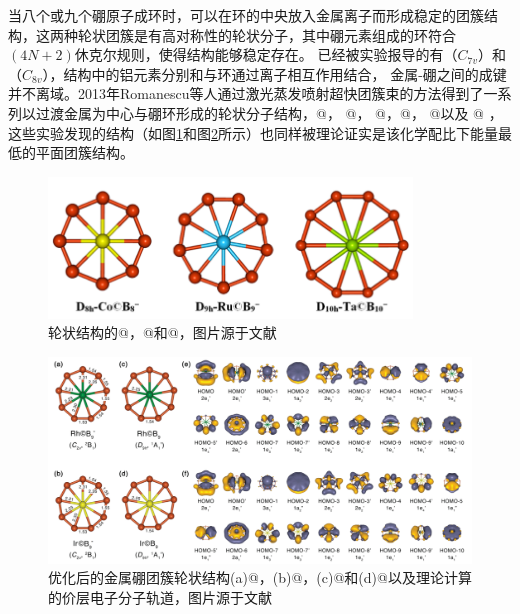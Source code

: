 当八个或九个硼原子成环时，可以在环的中央放入金属离子而形成稳定的团簇结构，这两种轮状团簇是有高对称性的轮状分子，其中硼元素组成的环符合$(4N+2)$休克尔规则，使得结构能够稳定存在\cite{zhai2003hepta,alexandrova2004molecular}。
已经被实验报导的有（$C_{7v}$）和（$C_{8v}$）\cite{galeev2011valence}，结构中的铝元素分别和与环通过离子相互作用结合，
金属-硼之间的成键并不离域。2013年Romanescu等人通过激光蒸发喷射超快团簇束的方法得到了一系列以过渡金属为中心与硼环形成的轮状分子结构，@， @， @，@， @以及 @ \cite{romanescu2011aromatic,galeev2011valence,li2012transition}，
这些实验发现的结构（如图\ref{fig:ch1_boron_wheel01}和图\ref{fig:ch1_boron_wheel02}所示）也同样被理论证实是该化学配比下能量最低的平面团簇结构。

\begin{figure}[bt]
  \includegraphics[width=0.86\textwidth]{figs/ch1_boron_wheel01.png}
  \centering
  \caption{轮状结构的@，@和@，图片源于文献\cite{romanescu2013transition}}
  \label{fig:ch1_boron_wheel01}
\end{figure}

\begin{figure}
  \includegraphics[width=1.0\textwidth]{figs/ch1_boron_wheel02.png}
  \centering
  \caption{优化后的金属硼团簇轮状结构(a)@，(b)@，(c)@和(d)@以及理论计算的价层电子分子轨道，图片源于文献\cite{li2012transition}}
  \label{fig:ch1_boron_wheel02}
\end{figure}

